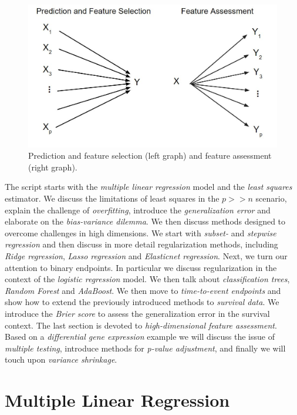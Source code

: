 \documentclass[
]{book}
\begin{document}
\begin{figure}
\includegraphics[width=0.9\linewidth]{twotasks} \caption{Prediction and feature selection (left graph) and feature assessment (right graph).}\label{fig:twotasks}
\end{figure}

The script starts with the \emph{multiple linear regression} model and the \emph{least squares} estimator. We discuss the limitations of least squares in the \(p>>n\) scenario, explain the challenge of \emph{overfitting}, introduce the \emph{generalization error} and elaborate on the \emph{bias-variance dilemma}. We then discuss methods designed to overcome challenges in high dimensions. We start with \emph{subset-} and \emph{stepwise regression} and then discuss in more detail regularization methods, including \emph{Ridge regression}, \emph{Lasso regression} and \emph{Elasticnet regression}. Next, we turn our attention to binary endpoints. In particular we discuss regularization in the context of the \emph{logistic regression} model. We then talk about \emph{classification trees}, \emph{Random Forest} and \emph{AdaBoost}. We then move to \emph{time-to-event endpoints} and show how to extend the previously introduced methods to \emph{survival data}. We introduce the \emph{Brier score} to assess the generalization error in the survival context. The last section is devoted to \emph{high-dimensional feature assessment}. Based on a \emph{differential gene expression} example we will discuss the issue of \emph{multiple testing}, introduce methods for \emph{p-value adjustment}, and finally we will touch upon \emph{variance shrinkage}.

\hypertarget{multiple-linear-regression}{%
\chapter{Multiple Linear Regression}\label{multiple-linear-regression}}
\end{document}
